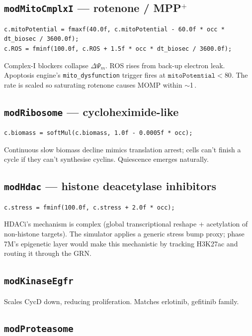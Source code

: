 \documentclass[11pt,letterpaper,twoside,openany]{book}
\newcommand{\code}[1]{\texttt{#1}}
\newcommand{\bioh}{\text{bio-h}}
\begin{document}
\subsection{\code{modMitoCmplxI} --- rotenone / MPP$^+$}

\begin{lstlisting}
c.mitoPotential = fmaxf(40.0f, c.mitoPotential - 60.0f * occ * dt_biosec / 3600.0f);
c.ROS = fminf(100.0f, c.ROS + 1.5f * occ * dt_biosec / 3600.0f);
\end{lstlisting}
Complex-I blockers collapse $\Delta\Psi_m$. ROS rises from back-up
electron leak. Apoptosis engine's \code{mito\_dysfunction} trigger
fires at $\code{mitoPotential} < 80$. The rate is scaled so
saturating rotenone causes MOMP within $\sim$1\,\bioh.

\subsection{\code{modRibosome} --- cycloheximide-like}

\begin{lstlisting}
c.biomass = softMul(c.biomass, 1.0f - 0.0005f * occ);
\end{lstlisting}
Continuous slow biomass decline mimics translation arrest; cells
can't finish a cycle if they can't synthesise cyclins. Quiescence
emerges naturally.

\subsection{\code{modHdac} --- histone deacetylase inhibitors}

\begin{lstlisting}
c.stress = fminf(100.0f, c.stress + 2.0f * occ);
\end{lstlisting}
HDACi's mechanism is complex (global transcriptional reshape +
acetylation of non-histone targets). The simulator applies a
generic stress bump proxy; phase 7M's epigenetic layer would make
this mechanistic by tracking H3K27ac and routing it through the
GRN.

\subsection{\code{modKinaseEgfr}}

Scales CycD down, reducing proliferation. Matches erlotinib,
gefitinib family.

\subsection{\code{modProteasome}}
\end{document}
